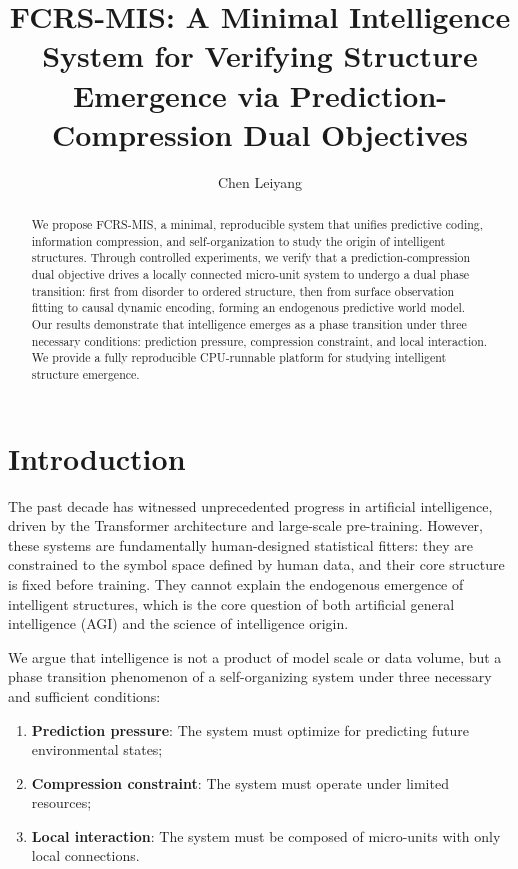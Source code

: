 \documentclass[11pt]{article}
\title{FCRS-MIS: A Minimal Intelligence System for Verifying Structure Emergence via Prediction-Compression Dual Objectives}
\author{Chen Leiyang}
\date{}
\begin{document}
\maketitle

\begin{abstract}
We propose FCRS-MIS, a minimal, reproducible system that unifies predictive coding, information compression, and self-organization to study the origin of intelligent structures. Through controlled experiments, we verify that a prediction-compression dual objective drives a locally connected micro-unit system to undergo a dual phase transition: first from disorder to ordered structure, then from surface observation fitting to causal dynamic encoding, forming an endogenous predictive world model. Our results demonstrate that intelligence emerges as a phase transition under three necessary conditions: prediction pressure, compression constraint, and local interaction. We provide a fully reproducible CPU-runnable platform for studying intelligent structure emergence.
\end{abstract}

\section{Introduction}

The past decade has witnessed unprecedented progress in artificial intelligence, driven by the Transformer architecture and large-scale pre-training. However, these systems are fundamentally human-designed statistical fitters: they are constrained to the symbol space defined by human data, and their core structure is fixed before training. They cannot explain the endogenous emergence of intelligent structures, which is the core question of both artificial general intelligence (AGI) and the science of intelligence origin.

We argue that intelligence is not a product of model scale or data volume, but a phase transition phenomenon of a self-organizing system under three necessary and sufficient conditions:

\begin{enumerate}
    \item \textbf{Prediction pressure}: The system must optimize for predicting future environmental states;
    \item \textbf{Compression constraint}: The system must operate under limited resources;
    \item \textbf{Local interaction}: The system must be composed of micro-units with only local connections.
\end{enumerate}
\end{document}
